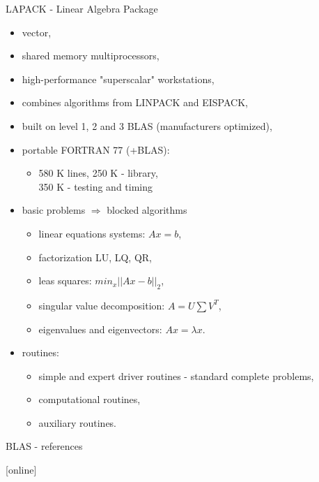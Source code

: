 	\begin{frame}[allowframebreaks]{LAPACK - Linear Algebra Package}
		\begin{itemize}
			\item vector,
			\item shared memory multiprocessors,
			\item high-performance "superscalar" workstations,
			\item combines algorithms from LINPACK and EISPACK,
			\item built on level 1, 2 and 3 BLAS (manufacturers optimized),
			\item portable FORTRAN 77 (+BLAS): 
			\begin{itemize}
				\item 580 K lines, 250 K - library, \\350 K - testing and timing
			\end{itemize}
			\item basic problems $\Rightarrow$ blocked algorithms
			\begin{itemize}
				\item linear equations systems: $Ax = b$, 
				\item factorization LU, LQ, QR,
				\item leas squares: $min_x ||Ax - b ||_2$,
				\item singular value decomposition: $A = U\sum V^T$,
				\item eigenvalues and eigenvectors: $Ax = \lambda x$.
			\end{itemize}
			\item routines:
			\begin{itemize}
				\item simple and expert driver routines - standard complete problems,
				\item computational routines,
				\item auxiliary routines.
			\end{itemize}
		\end{itemize}
	\end{frame}
	\begin{frame}{BLAS - references}
		\begin{thebibliography}{9}
		\end{thebibliography}
	\end{frame}
